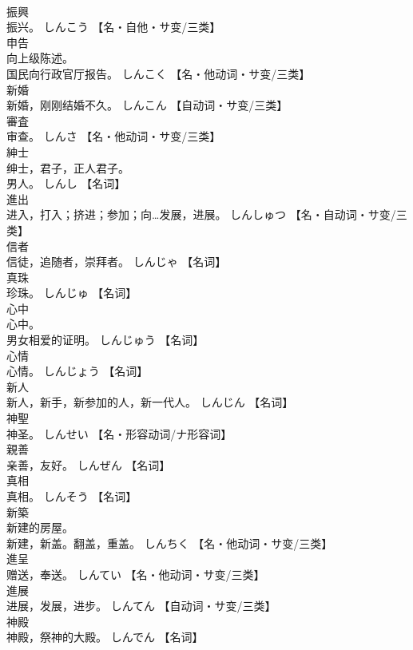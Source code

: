 \documentclass[8pt]{extreport}
\begin{document}
\begin{CJK}{UTF8}{min}
\\	振興	
\\	振兴。	しんこう		【名・自他・サ变/三类】
\\	申告	
\\	向上级陈述。 
\\	国民向行政官厅报告。	しんこく		【名・他动词・サ变/三类】
\\	新婚	
\\	新婚，刚刚结婚不久。	しんこん		【自动词・サ变/三类】
\\	審査	
\\	审查。	しんさ		【名・他动词・サ变/三类】
\\	紳士	
\\	绅士，君子，正人君子。 
\\	男人。	しんし		【名词】
\\	進出	
\\	进入，打入；挤进；参加；向…发展，进展。	しんしゅつ		【名・自动词・サ变/三类】
\\	信者	
\\	信徒，追随者，崇拜者。	しんじゃ		【名词】
\\	真珠	
\\	珍珠。	しんじゅ		【名词】
\\	心中	
\\	心中。 
\\	男女相爱的证明。	しんじゅう		【名词】
\\	心情	
\\	心情。	しんじょう		【名词】
\\	新人	
\\	新人，新手，新参加的人，新一代人。	しんじん		【名词】
\\	神聖	
\\	神圣。	しんせい		【名・形容动词/ナ形容词】
\\	親善	
\\	亲善，友好。	しんぜん		【名词】
\\	真相	
\\	真相。	しんそう		【名词】
\\	新築	
\\	新建的房屋。 
\\	新建，新盖。翻盖，重盖。	しんちく		【名・他动词・サ变/三类】
\\	進呈	
\\	赠送，奉送。	しんてい		【名・他动词・サ变/三类】
\\	進展	
\\	进展，发展，进步。	しんてん		【自动词・サ变/三类】
\\	神殿	
\\	神殿，祭神的大殿。	しんでん		【名词】

\end{CJK}
\end{document}
